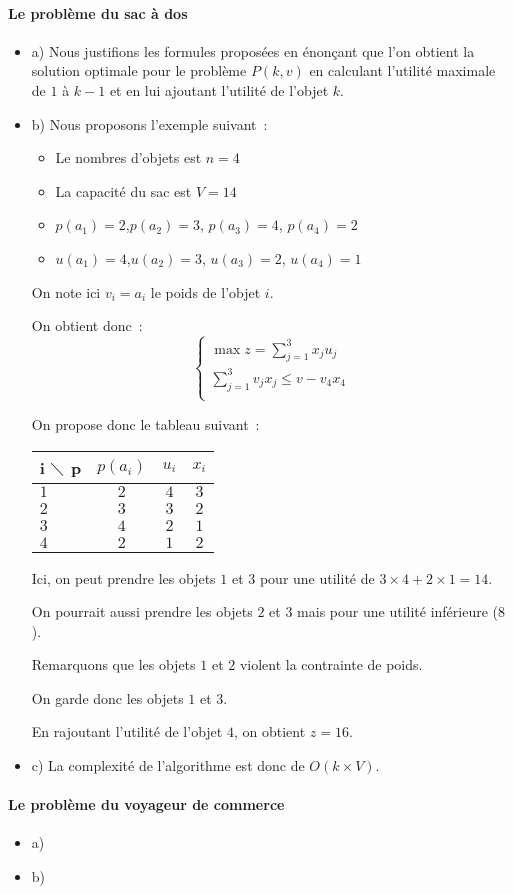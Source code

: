 \paragraph{Le problème du sac à dos}
\begin{itemize}
\item a) Nous justifions les formules proposées en énonçant que l'on
  obtient la solution optimale pour le problème $P(k,v)$ en calculant
  l'utilité maximale de $1$ à $k-1$ et en lui ajoutant l'utilité de
  l'objet $k$.
\item b) Nous proposons l'exemple suivant~:
\begin{itemize}
\item Le nombres d'objets est $n = 4$
\item La capacité du sac est $V = 14$
\item $p(a_1)=2$,$p(a_2)=3$, $p(a_3)=4$, $p(a_4)=2$
\item $u(a_1)=4$,$u(a_2)=3$, $u(a_3)=2$, $u(a_4)=1$
\end{itemize}
On note ici $v_i=a_i$ le poids de l'objet $i$.

On obtient donc~:
\begin{equation}
\begin{cases}
\max z = \sum_{j=1}^3 x_ju_j \\
\sum_{j=1}^3v_jx_j \leq v - v_4x_4 \\
\end{cases}
\end{equation}

On propose donc le tableau suivant~:
\begin{center}
\begin{tabular}{|l|c|c|c|}
\hline  i $\diagdown$ p  & $p(a_i)$ & $u_i$ & $x_i$  \\
\hline $1$ & $2$ & $4$ & $3$ \\
\hline $2$ & $3$ & $3$ & $2$  \\
\hline $3$ & $4$ & $2$ & $1$ \\
\hline $4$ & $2$ & $1$ & $2$ \\
\hline
\end{tabular}
\end{center}
\vspace{1cm}
Ici, on peut prendre les objets $1$ et $3$ pour une utilité de
$3 \times 4 + 2 \times 1 = 14$.


On pourrait aussi prendre les objets $2$ et $3$ mais pour une utilité
inférieure ($8$).

Remarquons que les objets $1$ et $2$ violent la contrainte de poids.


On garde donc les objets $1$ et $3$.

En rajoutant l'utilité de l'objet $4$, on obtient $z=16$.

\item c) La complexité de l'algorithme est donc de $O(k \times V)$.
\end{itemize}

\paragraph{Le problème du voyageur de commerce}

\begin{itemize}
\item a)
\item b)
\end{itemize}
